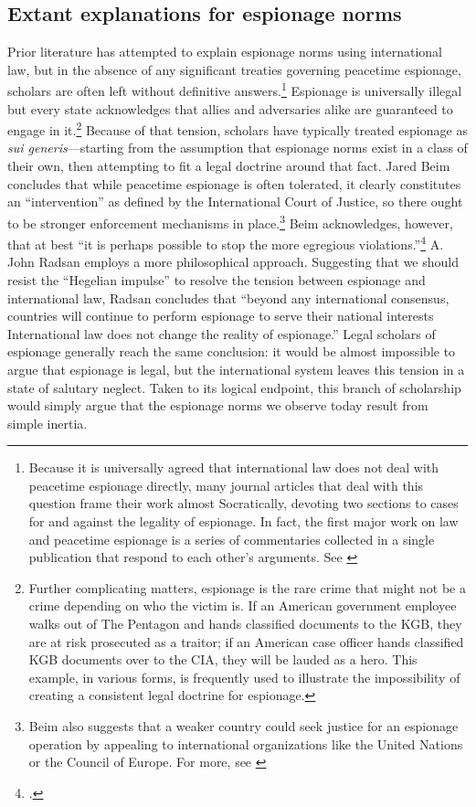 \documentclass[12pt]{extarticle}
\begin{document}
\subsection{Extant explanations for espionage norms}
Prior literature has attempted to explain espionage norms using international law, but in the absence of any significant treaties governing peacetime espionage, scholars are often left without definitive answers.\footnote{Because it is universally agreed that international law does not deal with peacetime espionage directly, many journal articles that deal with this question frame their work almost Socratically, devoting two sections to cases for and against the legality of espionage. In fact, the first major work on law and peacetime espionage is a series of commentaries collected in a single publication that respond to each other's arguments. See \cite{wright_essays_1962}} Espionage is universally illegal but every state acknowledges that allies and adversaries alike are guaranteed to engage in it.\footnote{Further complicating matters, espionage is the rare crime that might not be a crime depending on who the victim is. If an American government employee walks out of The Pentagon and hands classified documents to the KGB, they are at risk prosecuted as a traitor; if an American case officer hands classified KGB documents over to the CIA, they will be lauded as a hero. This example, in various forms, is frequently used to illustrate the impossibility of creating a consistent legal doctrine for espionage.} Because of that tension, scholars have typically treated espionage as \emph{sui generis}---starting from the assumption that espionage norms exist in a class of their own, then attempting to fit a legal doctrine around that fact. Jared Beim concludes that while peacetime espionage is often tolerated, it clearly constitutes an \enquote{intervention} as defined by the International Court of Justice, so there ought to be stronger enforcement mechanisms in place.\footnote{Beim also suggests that a weaker country could seek justice for an espionage operation by appealing to international organizations like the United Nations or the Council of Europe. For more, see \cite{beim_enforcing_2018}} Beim acknowledges, however, that at best \enquote{it is perhaps possible to stop the more egregious violations.}\footcite[672]{beim_enforcing_2018} A. John Radsan employs a more philosophical approach. Suggesting that we should resist the \enquote{Hegelian impulse} to resolve the tension between espionage and international law, Radsan concludes that \enquote{beyond any international consensus, countries will continue to perform espionage to serve their national interests \textelp{} International law does not change the reality of espionage.} Legal scholars of espionage generally reach the same conclusion: it would be almost impossible to argue that espionage is legal, but the international system leaves this tension in a state of salutary neglect. Taken to its logical endpoint, this branch of scholarship would simply argue that the espionage norms we observe today result from simple inertia.
\end{document}

